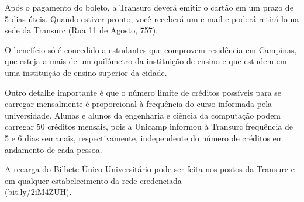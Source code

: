 Após o pagamento do boleto, a Transurc deverá emitir o cartão em um prazo de
5 dias úteis. Quando estiver pronto, você receberá um e-mail e poderá retirá-lo
na sede da Transurc (Rua 11 de Agosto, 757).

O benefício só é concedido a estudantes que comprovem residência em Campinas,
que esteja a mais de um quilômetro da instituição de ensino e que estudem em
uma instituição de ensino superior da cidade.

Outro detalhe importante é que o número limite de créditos possíveis para se
carregar mensalmente é proporcional à frequência do curso informada pela
universidade. Alunas e alunos da engenharia e ciência da computação podem
carregar 50 créditos mensais, pois a Unicamp informou à Transurc frequência de
5 e 6 dias semanais, respectivamente, independente do número de créditos em
andamento de cada pessoa.

A recarga do Bilhete Único Universitário pode ser feita nos postos da Transurc
e em qualquer estabelecimento da rede credenciada
\\(\url{bit.ly/2iM4ZUH}).
